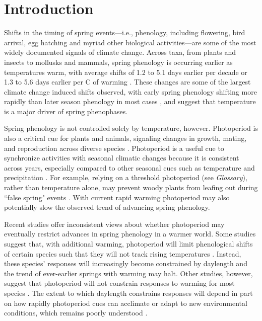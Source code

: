\documentclass{article}
\begin{document}
\section*{Introduction}
\par Shifts in the timing of spring events---i.e., phenology, including flowering, bird arrival, egg hatching and myriad other biological activities---are some of the most widely documented signals of climate change. Across taxa, from plants and insects to mollusks and mammals, spring phenology is occurring earlier as temperatures warm, with average shifts of 1.2 to 5.1 days earlier per decade \citep{bradley1999,parmesan2003, poloczanska2013,root2003} or 1.3 to 5.6 days earlier per \degree C of warming \citep{polgar2013,Wolkovich:2012n}. These changes are some of the largest climate change induced shifts observed, with early spring phenology shifting more rapidly than later season phenology in most cases \citep{bradley1999,menzel2006}, and suggest that temperature is a major driver of spring phenophases.

\par Spring phenology is not controlled solely by temperature, however. Photoperiod is also a critical cue for plants and animals, signaling changes in growth, mating, and reproduction across diverse species \citep[e.g.,][]{flynn2018,Howe:1996,lagercrantz2009,mcallan2006,solbakken1994}. Photoperiod is a useful cue to synchronize activities with seasonal climatic changes \citep[e.g.,][]{Basler:2012,Hsu:2011,Singh:2017} because it is consistent across years, especially compared to other seasonal cues such as temperature and precipitation \citep{saikkonen2012}. For example, relying on a threshold photoperiod (see \emph{Glossary}), rather than temperature alone, may prevent woody plants from leafing out during ``false spring" events \citep[unusually warm periods during winter that are followed by a return of cold temperatures,][] {Gu2008}. With current rapid warming photoperiod may also potentially slow the observed trend of advancing spring phenology. 

\par Recent studies offer inconsistent views about whether photoperiod may eventually restrict advances in spring phenology in a warmer world. Some studies suggest that, with additional warming, photoperiod will limit phenological shifts of certain species such that they will not track rising temperatures \citep[e.g., by leafing out earlier in the spring,][]{koerner2010b,way2015}. Instead, these species' responses will increasingly become constrained by daylength and the trend of ever-earlier springs with warming may halt. Other studies, however, suggest that photoperiod will not constrain responses to warming for most species \citep{chuine2010,zohner2016}. The extent to which daylength constrains responses will depend in part on how rapidly photoperiod cues can acclimate or adapt to new environmental conditions, which remains poorly understood \citep{grevstad2015}.
\end{document}
